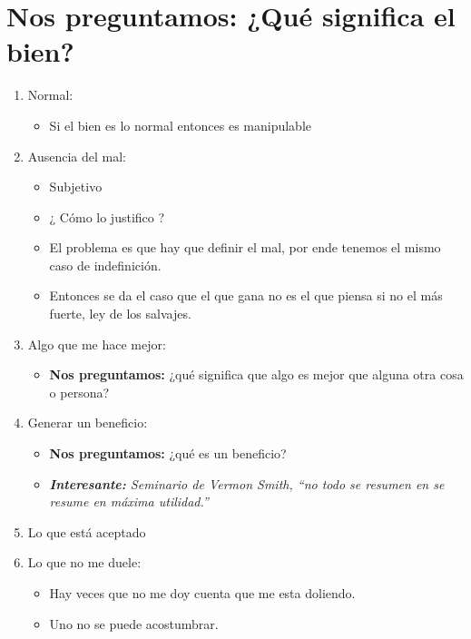 \section{\textbf{Nos preguntamos:} ¿Qué significa el bien?}
\begin{enumerate}
    \item Normal:
        \begin{itemize}
            \item Si el bien es lo normal entonces es manipulable
        \end{itemize}

    \item Ausencia del mal: 
        \begin{itemize}
            \item Subjetivo 
            \item ¿ Cómo lo justifico ?
            \item El problema es que hay que definir el mal, por ende tenemos el mismo caso de indefinición.
            \item Entonces se da el caso que el que gana no es el que piensa si no el más fuerte, ley de los salvajes.
        \end{itemize}

    \item Algo que me hace mejor:
        \begin{itemize}
            \item \textbf{Nos preguntamos:} ¿qué significa que algo es mejor que alguna otra cosa o persona?
        \end{itemize}

    \item Generar un beneficio:
        \begin{itemize}
            \item \textbf{Nos preguntamos:} ¿qué es un beneficio?
            \item \emph{\textbf{Interesante:} Seminario de Vermon Smith, ``no todo se resumen en se resume en máxima utilidad.''}
        \end{itemize}

    \item Lo que está aceptado 
    \item Lo que no me duele:
        \begin{itemize}
            \item Hay veces que no me doy cuenta que me esta doliendo.
            \item Uno no se puede acostumbrar.
        \end{itemize}


\end{enumerate}
